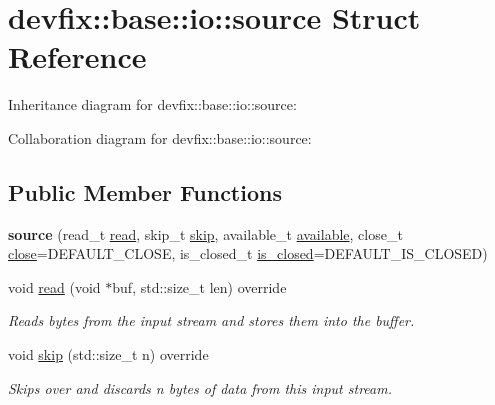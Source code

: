 \hypertarget{structdevfix_1_1base_1_1io_1_1source}{}\section{devfix\+:\+:base\+:\+:io\+:\+:source Struct Reference}
\label{structdevfix_1_1base_1_1io_1_1source}


Inheritance diagram for devfix\+:\+:base\+:\+:io\+:\+:source\+:


Collaboration diagram for devfix\+:\+:base\+:\+:io\+:\+:source\+:
\subsection*{Public Member Functions}
\begin{DoxyCompactItemize}
\item 
\mbox{\label{structdevfix_1_1base_1_1io_1_1source_af8bef20f5b54153c3fd1fbc7daa263c5}} 
{\bfseries source} (read\+\_\+t \hyperlink{structdevfix_1_1base_1_1io_1_1source_a9fbd4d20aa150910ced44018e1b3156a}{read}, skip\+\_\+t \hyperlink{structdevfix_1_1base_1_1io_1_1source_a21cb579307589cbc6f9e02d64c66f4b2}{skip}, available\+\_\+t \hyperlink{structdevfix_1_1base_1_1io_1_1source_a911f4ba79499a623de30cf16d3d26d47}{available}, close\+\_\+t \hyperlink{structdevfix_1_1base_1_1io_1_1source_aa00a381c8a166cbbc5dbf6de4b56590e}{close}=D\+E\+F\+A\+U\+L\+T\+\_\+\+C\+L\+O\+SE, is\+\_\+closed\+\_\+t \hyperlink{structdevfix_1_1base_1_1io_1_1source_a406834cf6651d48949b96d0ef49cc6c1}{is\+\_\+closed}=D\+E\+F\+A\+U\+L\+T\+\_\+\+I\+S\+\_\+\+C\+L\+O\+S\+ED)
\item 
void \hyperlink{structdevfix_1_1base_1_1io_1_1source_a9fbd4d20aa150910ced44018e1b3156a}{read} (void $\ast$buf, std\+::size\+\_\+t len) override
\begin{DoxyCompactList}\small\item\em Reads bytes from the input stream and stores them into the buffer. \end{DoxyCompactList}\item 
void \hyperlink{structdevfix_1_1base_1_1io_1_1source_a21cb579307589cbc6f9e02d64c66f4b2}{skip} (std\+::size\+\_\+t n) override
\begin{DoxyCompactList}\small\item\em Skips over and discards n bytes of data from this input stream. \end{DoxyCompactList}\item 

\end{DoxyCompactItemize}
